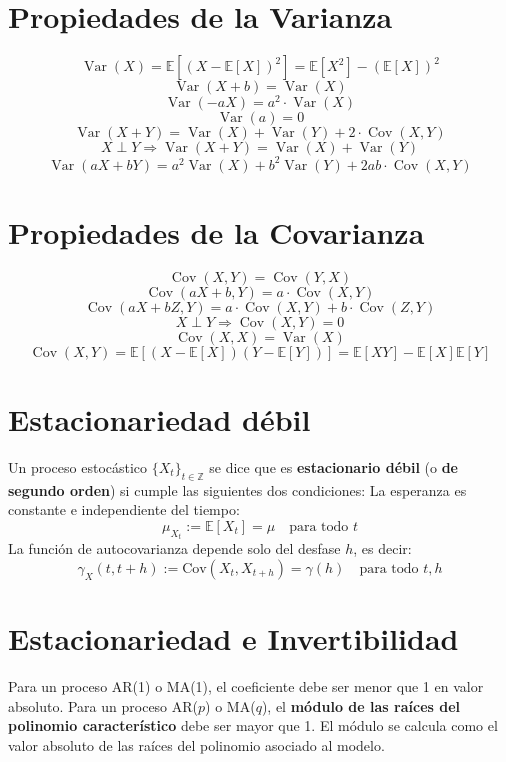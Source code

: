 \documentclass[12pt]{article} %
\begin{document}
\begin{multicols}{3}

\tiny 


\section*{Propiedades de la Varianza}
\[
\operatorname{Var}(X) = \mathbb{E}[(X - \mathbb{E}[X])^2] = \mathbb{E}[X^2] - (\mathbb{E}[X])^2
\]
\[
\operatorname{Var}(X + b) = \operatorname{Var}(X)
\]
\[
\operatorname{Var}(-aX) = a^2 \cdot \operatorname{Var}(X)
\]
\[
\operatorname{Var}(a) = 0
\]
\[
\operatorname{Var}(X + Y) = \operatorname{Var}(X) + \operatorname{Var}(Y) + 2 \cdot \operatorname{Cov}(X, Y)
\]
\[
X \perp Y \Rightarrow \operatorname{Var}(X + Y) = \operatorname{Var}(X) + \operatorname{Var}(Y)
\]
\[
\operatorname{Var}(aX + bY) = a^2 \operatorname{Var}(X) + b^2 \operatorname{Var}(Y) + 2ab \cdot \operatorname{Cov}(X, Y)
\]
\section*{Propiedades de la Covarianza}
\[
\operatorname{Cov}(X, Y) = \operatorname{Cov}(Y, X)
\]
\[
\operatorname{Cov}(aX + b, Y) = a \cdot \operatorname{Cov}(X, Y)
\]
\[
\operatorname{Cov}(aX + bZ, Y) = a \cdot \operatorname{Cov}(X, Y) + b \cdot \operatorname{Cov}(Z, Y)
\]
\[
X \perp Y \Rightarrow \operatorname{Cov}(X, Y) = 0
\]
\[
\operatorname{Cov}(X, X) = \operatorname{Var}(X)
\]
\[
\operatorname{Cov}(X, Y) = \mathbb{E}[(X - \mathbb{E}[X])(Y - \mathbb{E}[Y])] = \mathbb{E}[XY] - \mathbb{E}[X]\mathbb{E}[Y]
\]
\section*{Estacionariedad débil}
Un proceso estocástico \( \{X_t\}_{t \in \mathbb{Z}} \) se dice que es \textbf{estacionario débil} (o \textbf{de segundo orden}) si cumple las siguientes dos condiciones:
La esperanza es constante e independiente del tiempo:
    \[
    \mu_{X_t} := \mathbb{E}[X_t] = \mu \quad \text{para todo } t
    \]
La función de autocovarianza depende solo del desfase \( h \), es decir:
    \[
    \gamma_X(t, t+h) := \text{Cov}(X_t, X_{t+h}) = \gamma(h) \quad \text{para todo } t,h
    \]
\section*{Estacionariedad e Invertibilidad}
Para un proceso AR(1) o MA(1), el coeficiente debe ser menor que 1 en valor absoluto.  
Para un proceso AR($p$) o MA($q$), el \textbf{módulo de las raíces del polinomio característico} debe ser mayor que 1.
El módulo se calcula como el valor absoluto de las raíces del polinomio asociado al modelo.

\end{multicols}
\end{document}
